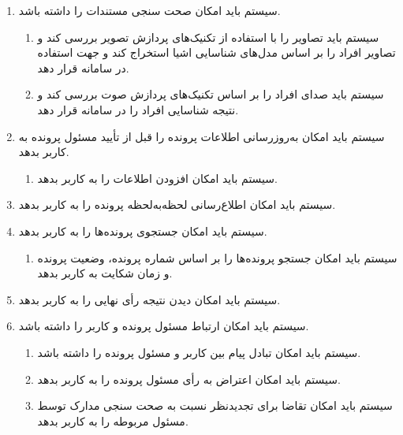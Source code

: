 \documentclass[12pt,a4paper,oneside]{article}
\begin{document}
\begin{itemize}
\begin{enumerate}
        \item 
        سیستم باید امکان صحت سنجی مستندات را داشته باشد.
        \begin{enumerate}
            \renewcommand{\labelenumii}{\textbf{.R\arabic{enumi}.\arabic{enumii}}}
            \item 
            سیستم باید تصاویر را با استفاده از تکنیک‌های پردازش تصویر بررسی کند و تصاویر افراد را بر اساس مدل‌های شناسایی اشیا استخراج کند و جهت استفاده در سامانه قرار دهد.
            \item 
            سیستم باید صدای افراد را بر اساس تکنیک‌های پردازش صوت بررسی کند و نتیجه شناسایی افراد را در سامانه قرار دهد.
        \end{enumerate}

        \item 
        سیستم باید امکان به‌روزرسانی اطلاعات پرونده را قبل از تأیید مسئول پرونده به کاربر بدهد.
        \begin{enumerate}
            \renewcommand{\labelenumii}{\textbf{.R\arabic{enumi}.\arabic{enumii}}}
            \item 
            سیستم باید امکان افزودن اطلاعات را به کاربر بدهد.
        \end{enumerate}

        \item 
        سیستم باید امکان اطلاع‌رسانی لحظه‌به‌لحظه پرونده را به کاربر بدهد.

        \item 
        سیستم باید امکان جستجوی پرونده‌ها را به کاربر بدهد.
        \begin{enumerate}
            \renewcommand{\labelenumii}{\textbf{.R\arabic{enumi}.\arabic{enumii}}}
            \item 
            سیستم باید امکان جستجو پرونده‌ها را بر اساس شماره پرونده، وضعیت پرونده و زمان شکایت به کاربر بدهد.
        \end{enumerate}

        \item 
        سیستم باید امکان دیدن نتیجه رأی نهایی را به کاربر بدهد.

        \item 
        سیستم باید امکان ارتباط مسئول پرونده و کاربر را داشته باشد.
        \begin{enumerate}
            \renewcommand{\labelenumii}{\textbf{.R\arabic{enumi}.\arabic{enumii}}}
            \item 
            سیستم باید امکان تبادل پیام بین کاربر و مسئول پرونده را داشته باشد.
            \item 
            سیستم باید امکان اعتراض به رأی مسئول پرونده را به کاربر بدهد.
            \item 
            سیستم باید امکان تقاضا برای تجدیدنظر نسبت به صحت سنجی مدارک توسط مسئول مربوطه را به کاربر بدهد.
        \end{enumerate}


\end{enumerate}
\end{itemize}
\end{document}
